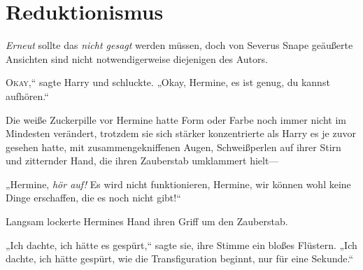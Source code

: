 \chapter{Reduktionismus}

\begin{chapterOpeningAuthorNote}
% 
\emph{Erneut} sollte das \emph{nicht gesagt} werden müssen, doch von Severus Snape geäußerte Ansichten sind nicht notwendigerweise diejenigen des Autors.
\end{chapterOpeningAuthorNote}

\lettrine[ante=„]{O}{kay},“ sagte Harry und schluckte. „Okay, Hermine, es ist genug, du kannst aufhören.“

Die weiße Zuckerpille vor Hermine hatte Form oder Farbe noch immer nicht im Mindesten verändert, trotzdem sie sich stärker konzentrierte als Harry es je zuvor gesehen hatte, mit zusammengekniffenen Augen, Schweißperlen auf ihrer Stirn und zitternder Hand, die ihren Zauberstab umklammert hielt—

„Hermine, \emph{hör auf!} Es wird nicht funktionieren, Hermine, wir können wohl keine Dinge erschaffen, die es noch nicht gibt!“

Langsam lockerte Hermines Hand ihren Griff um den Zauberstab.

„Ich dachte, ich hätte es gespürt,“ sagte sie, ihre Stimme ein bloßes Flüstern. „Ich dachte, ich hätte gespürt, wie die Transfiguration beginnt, nur für eine Sekunde.“

